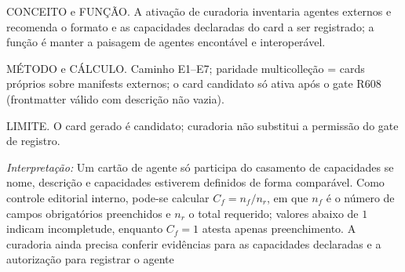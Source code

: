 \begin{descricao}
CONCEITO e FUNÇÃO. A ativação de curadoria inventaria agentes externos e
recomenda o formato e as capacidades declaradas do card a ser registrado; a
função é manter a paisagem de agentes encontável e interoperável.
\end{descricao}
\begin{metodo}
MÉTODO e CÁLCULO. Caminho E1--E7; paridade multicolleção = cards próprios sobre
manifests externos; o card candidato só ativa após o gate R608 (frontmatter
válido com descrição não vazia).
\end{metodo}
\begin{aviso}
LIMITE. O card gerado é candidato; curadoria não substitui a permissão do
gate de registro.
\end{aviso}
\noindent\textit{Interpretação:} Um cartão de agente só participa do casamento de capacidades se nome, descrição e capacidades estiverem definidos de forma comparável. Como controle editorial interno, pode-se calcular $C_f=n_f/n_r$, em que $n_f$ é o número de campos obrigatórios preenchidos e $n_r$ o total requerido; valores abaixo de $1$ indicam incompletude, enquanto $C_f=1$ atesta apenas preenchimento. A curadoria ainda precisa conferir evidências para as capacidades declaradas e a autorização para registrar o agente  %
